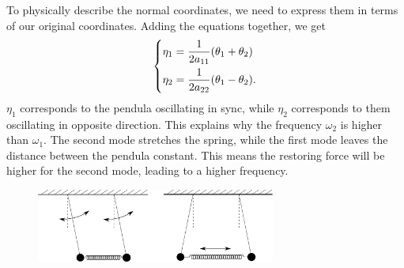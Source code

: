 \documentclass{article}
\begin{document}
        To physically describe the normal coordinates, we need to express them in terms of our original coordinates. Adding the equations together, we get
        \begin{equation*}
            \begin{dcases}
                \eta_1 = \frac{1}{2a_{11}}(\theta_1 + \theta_2) \\
                \eta_2 = \frac{1}{2a_{22}}(\theta_1 - \theta_2).
            \end{dcases}
        \end{equation*}
        $\eta_1$ corresponds to the pendula oscillating in sync, while $\eta_2$ corresponds to them oscillating in opposite direction. This explains why the frequency $\omega_2$ is higher than $\omega_1$. The second mode stretches the spring, while the first mode leaves the distance between the pendula constant. This means the restoring force will be higher for the second mode, leading to a higher frequency.
        \begin{figure}[h]
            \centering
            \includegraphics[width=0.7\textwidth]{figures/figure_5.pdf}
        \end{figure}
\end{document}
